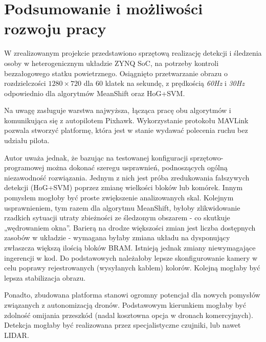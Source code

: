 \chapter{Podsumowanie i możliwości rozwoju pracy}

W zrealizowanym projekcie przedstawiono sprzętową realizację detekcji i śledzenia osoby w heterogenicznym układzie ZYNQ SoC, na potrzeby kontroli bezzałogowego statku powietrznego. Osiągnięto przetwarzanie obrazu o rozdzielczości $1280\times 720$ dla 60 klatek na sekundę, z prędkością \textit{60Hz} i \textit{30Hz} odpowiednio dla algorytmów MeanShift oraz HoG+SVM.

Na uwagę zasługuje warstwa najwyższa, łącząca pracę obu algorytmów i komunikująca się z autopilotem Pixhawk. Wykorzystanie protokołu MAVLink pozwala stworzyć platformę, która jest w stanie wydawać polecenia ruchu bez udziału pilota.

Autor uważa jednak, że bazując na testowanej konfiguracji sprzętowo-programowej można dokonać szeregu usprawnień, podnoszących ogólną niezawodność rozwiązania. Jednym z nich jest próba zredukowania fałszywych detekcji (HoG+SVM) poprzez zmianę wielkości bloków lub komórek. Innym pomysłem mogłoby być proste zwiększenie analizowanych skal. Kolejnym usprawnieniem, tym razem dla algorytmu MeanShift, byłoby zlikwidowanie rzadkich sytuacji utraty zbieżności ze śledzonym obszarem - co skutkuje „wędrowaniem okna”. Barierą na drodze większości zmian jest liczba dostępnych zasobów w układzie - wymagana byłaby zmiana układu na dysponujący zwłaszcza większą ilością bloków BRAM. Istnieją jednak zmiany niewymagające ingerencji w kod. Do podstawowych należałoby lepsze skonfigurowanie kamery w celu poprawy rejestrowanych (wysyłanych kablem) kolorów. Kolejną mogłaby być lepsza stabilizacja obrazu.

Ponadto, zbudowana platforma stanowi ogromny potencjał dla nowych pomysłów związanych z autonomizacją dronów. Podstawowym kierunkiem mogłaby być zdolność omijania przeszkód (nadal kosztowna opcja w dronach komercyjnych). Detekcja mogłaby być realizowana przez specjalistyczne czujniki, lub nawet LIDAR.\newline 



